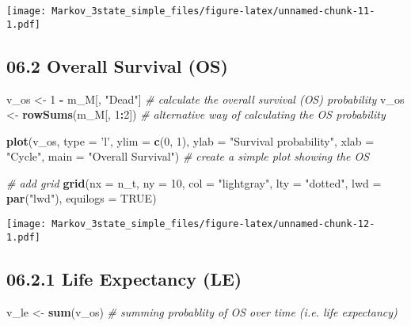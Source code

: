 \documentclass[
]{article}
\newenvironment{Shaded}{\begin{snugshade}}{\end{snugshade}}
\newcommand{\CommentTok}[1]{\textcolor[rgb]{0.56,0.35,0.01}{\textit{#1}}}
\newcommand{\DataTypeTok}[1]{\textcolor[rgb]{0.13,0.29,0.53}{#1}}
\newcommand{\DecValTok}[1]{\textcolor[rgb]{0.00,0.00,0.81}{#1}}
\newcommand{\KeywordTok}[1]{\textcolor[rgb]{0.13,0.29,0.53}{\textbf{#1}}}
\newcommand{\NormalTok}[1]{#1}
\newcommand{\OperatorTok}[1]{\textcolor[rgb]{0.81,0.36,0.00}{\textbf{#1}}}
\newcommand{\OtherTok}[1]{\textcolor[rgb]{0.56,0.35,0.01}{#1}}
\newcommand{\StringTok}[1]{\textcolor[rgb]{0.31,0.60,0.02}{#1}}
\begin{document}
\texttt{[image: Markov\_3state\_simple\_files/figure-latex/unnamed-chunk-11-1.pdf]}

\hypertarget{overall-survival-os}{%
\subsection{06.2 Overall Survival (OS)}\label{overall-survival-os}}

\begin{Shaded}
\begin{Highlighting}[]
\NormalTok{v_os <-}\StringTok{ }\DecValTok{1} \OperatorTok{-}\StringTok{ }\NormalTok{m_M[, }\StringTok{"Dead"}\NormalTok{]             }\CommentTok{# calculate the overall survival (OS) probability}
\NormalTok{v_os <-}\StringTok{ }\KeywordTok{rowSums}\NormalTok{(m_M[, }\DecValTok{1}\OperatorTok{:}\DecValTok{2}\NormalTok{])           }\CommentTok{# alternative way of calculating the OS probability   }

\KeywordTok{plot}\NormalTok{(v_os, }\DataTypeTok{type =} \StringTok{'l'}\NormalTok{, }
     \DataTypeTok{ylim =} \KeywordTok{c}\NormalTok{(}\DecValTok{0}\NormalTok{, }\DecValTok{1}\NormalTok{),}
     \DataTypeTok{ylab =} \StringTok{"Survival probability"}\NormalTok{,}
     \DataTypeTok{xlab =} \StringTok{"Cycle"}\NormalTok{,}
     \DataTypeTok{main =} \StringTok{"Overall Survival"}\NormalTok{)       }\CommentTok{# create a simple plot showing the OS}

\CommentTok{# add grid }
\KeywordTok{grid}\NormalTok{(}\DataTypeTok{nx =}\NormalTok{ n_t, }\DataTypeTok{ny =} \DecValTok{10}\NormalTok{, }\DataTypeTok{col =} \StringTok{"lightgray"}\NormalTok{, }\DataTypeTok{lty =} \StringTok{"dotted"}\NormalTok{, }\DataTypeTok{lwd =} \KeywordTok{par}\NormalTok{(}\StringTok{"lwd"}\NormalTok{), }
     \DataTypeTok{equilogs =} \OtherTok{TRUE}\NormalTok{) }
\end{Highlighting}
\end{Shaded}

\texttt{[image: Markov\_3state\_simple\_files/figure-latex/unnamed-chunk-12-1.pdf]}

\hypertarget{life-expectancy-le}{%
\subsection{06.2.1 Life Expectancy (LE)}\label{life-expectancy-le}}

\begin{Shaded}
\begin{Highlighting}[]
\NormalTok{v_le <-}\StringTok{ }\KeywordTok{sum}\NormalTok{(v_os)           }\CommentTok{# summing probablity of OS over time  (i.e. life expectancy)}
\end{Highlighting}
\end{Shaded}
\end{document}
